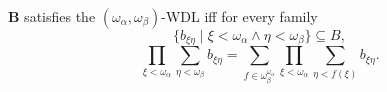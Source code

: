 $\mathbf{B}$ satisfies the $(\omega_\alpha, \omega_\beta)$-WDL iff for every family
$$\{b_{\xi \eta} \mid \xi < \omega_\alpha \land \eta < \omega_\beta\} \subseteq B,$$
$$\prod_{\xi < \omega_\alpha} \sum_{\eta < \omega_\beta} b_{\xi \eta} = \sum_{f \in \omega_\beta^{\omega_\alpha}} \prod_{\xi < \omega_\alpha} \sum_{\eta < f(\xi)} b_{\xi \eta}.$$
